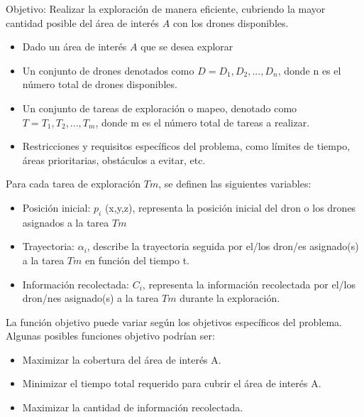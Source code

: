 \documentclass{article}
\begin{document}
Objetivo: Realizar la exploración de manera eficiente, cubriendo la mayor cantidad posible del área de interés $A$ con los drones disponibles.

\begin{itemize}
\item Dado un área de interés $A$ que se desea explorar
\item Un conjunto de drones denotados como $D={D_1,D_2,...,D_n}$, donde n es el número total de drones disponibles.
\item Un conjunto de tareas de exploración o mapeo, denotado como $T={T_1,T_2,...,T_m}$, donde m es el número total de tareas a realizar.
\item Restricciones y requisitos específicos del problema, como límites de tiempo, áreas prioritarias, obstáculos a evitar, etc.
\end{itemize}

Para cada tarea de exploración $Tm$, se definen las siguientes variables:

\begin{itemize}
\item Posición inicial: $p_i$ (x,y,z), representa la posición inicial del dron o los drones asignados a la tarea $Tm$
\item Trayectoria: $\alpha_i$, describe la trayectoria seguida por el/los dron/es asignado(s) a la tarea $Tm$ en función del tiempo t.
\item Información recolectada: $C_i$, representa la información recolectada por el/los dron/nes asignado(s) a la tarea $Tm$ durante la exploración.
\end{itemize}

La función objetivo puede variar según los objetivos específicos del problema. Algunas posibles funciones objetivo podrían ser:

\begin{itemize}
\item Maximizar la cobertura del área de interés A.
\item Minimizar el tiempo total requerido para cubrir el área de interés A.
\item Maximizar la cantidad de información recolectada.
\end{itemize}
\end{document}
